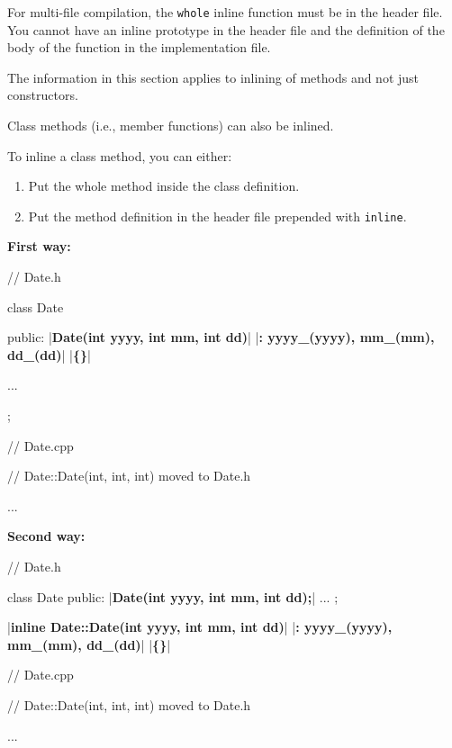 For multi-file compilation, the \texttt{whole} inline function must be in
the header file. You cannot have an inline prototype in the header file
and the definition of the body of the function in the implementation
file.


\newpage{}

The information in this section applies to inlining of methods and not
just constructors.

Class methods (i.e., member functions) can also be inlined.

To inline a class method, you can either:

\begin{enumerate}
\item Put the whole method inside the class definition.
\item Put the method definition in the header file prepended with
  \texttt{inline}.
\end{enumerate}

\textbf{First way:}

\begin{consolethree}[escapeinside=||]
// Date.h

class Date
{
public:
    |\textbf{Date(int yyyy, int mm, int dd)}|
        |\textbf{: yyyy\_(yyyy), mm\_(mm), dd\_(dd)}|
    |\textbf{\{\}}|

    ...
};
\end{consolethree}

\begin{consolethree}[escapeinside=||]
// Date.cpp

// Date::Date(int, int, int) moved to Date.h

...
\end{consolethree}

\textbf{Second way:}

\begin{consolethree}[escapeinside=||]
// Date.h

class Date
{
public:
    |\textbf{Date(int yyyy, int mm, int dd);}|
    ...
};

|\textbf{inline Date::Date(int yyyy, int mm, int dd)}|
    |\textbf{: yyyy\_(yyyy), mm\_(mm), dd\_(dd)}|
|\textbf{\{\}}|
\end{consolethree}

\begin{consolethree}[escapeinside=||]
// Date.cpp

// Date::Date(int, int, int) moved to Date.h

...
\end{consolethree}

